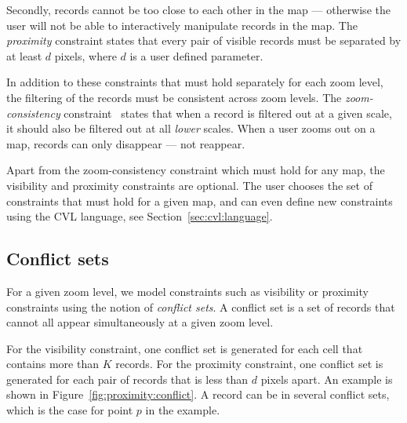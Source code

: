 Secondly, records cannot be too close to each other in the map --- otherwise the user will not be able to interactively manipulate records in the map. The \emph{proximity} constraint states that every pair of visible records must be separated by at least $d$ pixels, where $d$ is a user defined parameter.

In addition to these constraints that must hold separately for each zoom level, the filtering of the records must be consistent across zoom levels. The \emph{zoom-consistency} constraint~\cite{sarma2012fusiontables} states that when a record is filtered out at a given scale, it should also be filtered out at all \emph{lower} scales. When a user zooms out on a map, records can only disappear --- not reappear.

Apart from the zoom-consistency constraint which must hold for any map, the visibility and proximity constraints are optional. The user chooses the set of constraints that must hold for a given map, and can even define new constraints using the CVL language, see Section~\ref{sec:cvl:language}.

\subsection{Conflict sets}
\label{sec:conflict:sets}

For a given zoom level, we model constraints such as visibility or proximity constraints using the notion of \emph{conflict sets}. A conflict set is a set of records that cannot all appear simultaneously at a given zoom level. 

For the visibility constraint, one conflict set is generated for each cell that contains more than $K$ records. For the proximity constraint, one conflict set is generated for each pair of records that is less than $d$ pixels apart. An example is shown in Figure~\ref{fig:proximity:conflict}. A record can be in several conflict sets, which is the case for point $p$ in the example.

